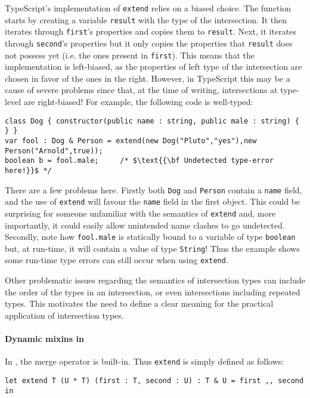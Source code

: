 TypeScript's implementation of \lstinline{extend} relies on a biased choice.
The function starts by creating a variable \lstinline$result$ with the type of the intersection. 
It then iterates through \lstinline$first$'s properties and copies them to 
\lstinline$result$.
Next, it iterates through \lstinline$second$'s properties but it only copies the properties
that \lstinline$result$ does not possess yet (i.e. the ones present in \lstinline$first$).
This means that the implementation is left-biased, as the properties of left type of the intersection
are chosen in favor of the ones in the right.
However, in TypeScript this may be a cause of severe problems since that, at the time of writing,
intersections at type-level are right-biased!
For example, the following code is well-typed:

\begin{lstlisting}[mathescape=true]
class Dog { constructor(public name : string, public male : string) { } }
var fool : Dog & Person = extend(new Dog("Pluto","yes"),new Person("Arnold",true));
boolean b = fool.male;     /* $\text{{\bf Undetected type-error here!}}$ */
\end{lstlisting}
There are a few problems here. Firstly both \lstinline{Dog} and
\lstinline{Person} contain a \lstinline{name} field, and the use of
\lstinline{extend} will favour the \lstinline{name} field in the first object. This
could be surprising for someone unfamiliar with the semantics of
\lstinline{extend} and, more importantly, it could easily allow
unintended name clashes to go undetected. 
Secondly, note how \lstinline$fool.male$ is statically
bound to a variable of type \lstinline$boolean$ but, at run-time, it
will contain a value of type \lstinline$String$! Thus the example
shows some run-time type errors can still occur when using \lstinline{extend}.

Other problematic issues regarding the semantics of intersection types can include the order of 
the types in an intersection, or even intersections including repeated types.
This motivates the need to define a clear meaning for the practical application of 
intersection types.

\paragraph{Dynamic mixins in \name}
In \name, the merge operator is built-in. 
Thus \lstinline{extend} is simply defined as follows:

\begin{lstlisting}
let extend T (U * T) (first : T, second : U) : T & U = first ,, second in 
\end{lstlisting}

